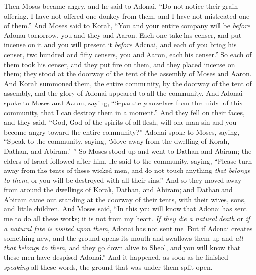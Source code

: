 \begin{biblechapter}
\verse Then Moses became angry, and he said to Adonai, “Do not notice their grain offering. I have not offered one donkey from them, and I have not mistreated one of them.”
\verse And Moses said to Korah, “You and your entire company will be \textit{before} Adonai tomorrow, you and they and Aaron.
\verse Each one take his censer, and put incense on it and you will present it \textit{before} Adonai, and each of you bring his censer, two hundred and fifty censers, you and Aaron, each his censer.”
\verse So each of them took his censer, and they put fire on them, and they placed incense on them; they stood at the doorway of the tent of the assembly of Moses and Aaron.
\verse And Korah summoned them, the entire community, by the doorway of the tent of assembly, and the glory of Adonai appeared to all the community.
\verse And Adonai spoke to Moses and Aaron, saying,
\verse “Separate yourselves from the midst of this community, that I can destroy them in a moment.”
\verse And they fell on their faces, and they said, “God, God of the spirits of all flesh, will one man sin and you become angry toward the entire community?”
\verse Adonai spoke to Moses, saying,
\verse “Speak to the community, saying, ‘Move away from the dwelling of Korah, Dathan, and Abiram.’ ”
\verse So Moses stood up and went to Dathan and Abiram; the elders of Israel followed after him.
\verse He said to the community, saying, “Please turn away from the tents of these wicked men, and do not touch anything \textit{that belongs to them}, or you will be destroyed with all their sins.”
\verse And so they moved away from around the dwellings of Korah, Dathan, and Abiram; and Dathan and Abiram came out standing at the doorway of their tents, with their wives, sons, and little children.
\verse And Moses said, “In this you will know that Adonai has sent me to do all these works; it is not from my heart.
\verse \textit{If they die a natural death} or \textit{if a natural fate is visited upon them}, Adonai has not sent me.
\verse But if Adonai creates something new, and the ground opens its mouth and swallows them up and \textit{all that belongs to them}, and they go down alive to Sheol, and you will know that these men have despised Adonai.”
\verse And it happened, as soon as he finished \textit{speaking} all these words, the ground that was under them split open.

\end{biblechapter}
